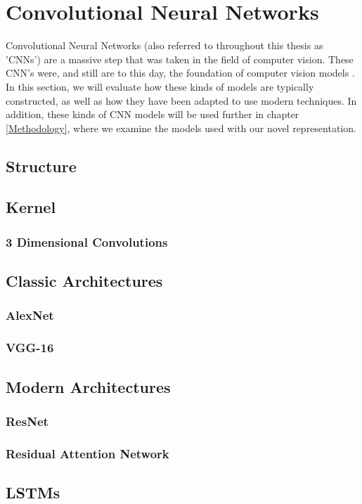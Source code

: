 
\chapter{Convolutional Neural Networks} %

\label{ConvolutionalNeuralNetworks} %

Convolutional Neural Networks (also referred to throughout this thesis as 'CNNs') are a massive step that was taken in the field of computer vision. These CNN's were, and still are to this day, the foundation of computer vision models \cite{deeplearning}. In this section, we will evaluate how these kinds of models are typically constructed, as well as how they have been adapted to use modern techniques. In addition, these kinds of CNN models will be used further in chapter \ref{Methodology}, where we examine the models used with our novel representation.

\section{Structure}

\section{Kernel}

\subsection{3 Dimensional Convolutions}
\label{3dkernels}

\section{Classic Architectures}

\subsection{AlexNet}
\label{sec:alexnet}

\subsection{VGG-16}

\section{Modern Architectures}

\subsection{ResNet}

\subsection{Residual Attention Network}

\section{LSTMs}
\label{sec:LSTM}